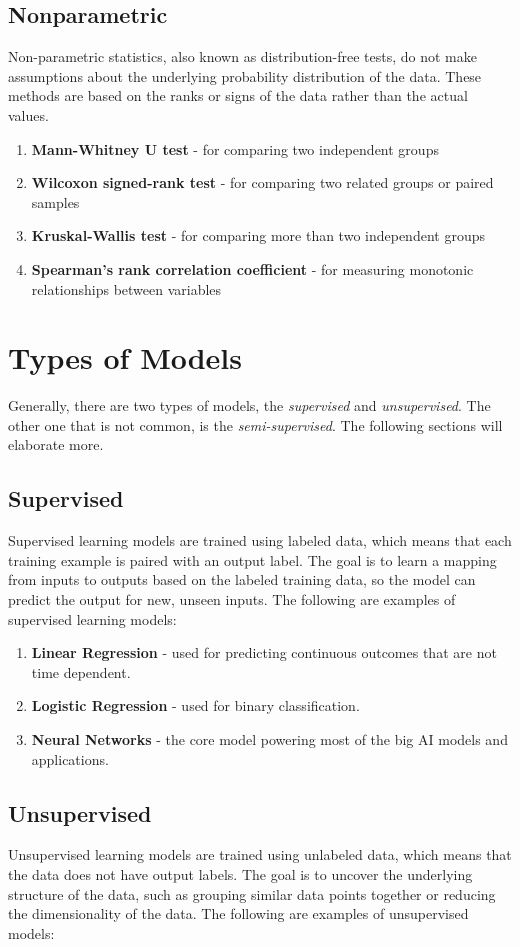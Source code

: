 \subsection{Nonparametric}
Non-parametric statistics, also known as distribution-free tests, do not make assumptions about the underlying probability distribution of the data. These methods are based on the ranks or signs of the data rather than the actual values.
\begin{enumerate}
    \item \textbf{Mann-Whitney U test} - for comparing two independent groups
    \item \textbf{Wilcoxon signed-rank test} - for comparing two related groups or paired samples
    \item \textbf{Kruskal-Wallis test} - for comparing more than two independent groups
    \item \textbf{Spearman's rank correlation coefficient} - for measuring monotonic relationships between variables
\end{enumerate}
\section{Types of Models}
Generally, there are two types of models, the \textit{supervised} and \textit{unsupervised}. The other one that is not common, is the \textit{semi-supervised}. The following sections will elaborate more.
\subsection{Supervised}
Supervised learning models are trained using labeled data, which means that each training example is paired with an output label. The goal is to learn a mapping from inputs to outputs based on the labeled training data, so the model can predict the output for new, unseen inputs. The following are examples of supervised learning models:
\begin{enumerate}
    \item \textbf{Linear Regression} - used for predicting continuous outcomes that are not time dependent.
    \item \textbf{Logistic Regression} - used for binary classification.
    \item \textbf{Neural Networks} - the core model powering most of the big AI models and applications.
\end{enumerate}
\subsection{Unsupervised}\label{sec:unsupervised_models}
Unsupervised learning models are trained using unlabeled data, which means that the data does not have output labels. The goal is to uncover the underlying structure of the data, such as grouping similar data points together or reducing the dimensionality of the data. The following are examples of unsupervised models:


